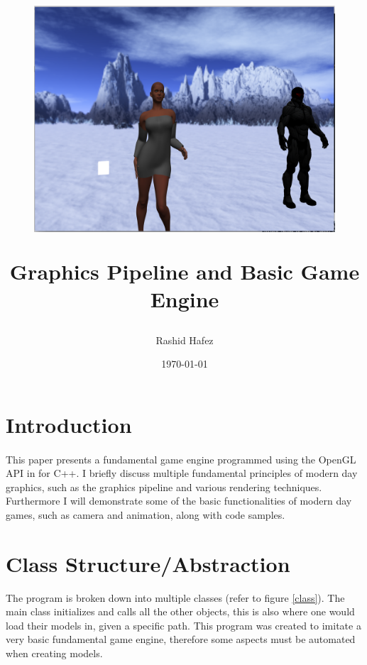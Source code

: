 \documentclass[a4paper,11pt]{article}
\begin{document}
	\title{	\begin{figure}[h]
		\centering
		\includegraphics[scale=0.4]{BK}
		\label{HW-logo}
		\vspace{2 cm}
	\end{figure} 
	Graphics Pipeline and Basic Game Engine}
	\author{Rashid Hafez}
	\date{\today}
	\maketitle
	
	\newpage
	\section{Introduction}
	\paragraph{}
		This paper presents a fundamental game engine programmed using the OpenGL API in for C++. I briefly discuss multiple fundamental principles of modern day graphics, such as the graphics pipeline and various rendering techniques. Furthermore I will demonstrate some of the basic functionalities of modern day games, such as camera and animation, along with code samples.
		
	\clearpage
	\newpage
	\section{Class Structure/Abstraction}
		
		The program is broken down into multiple classes (refer to figure \ref{class}). The main class initializes and calls all the other objects, this is also where one would load their models in, given a specific path. This program was created to imitate a very basic fundamental game engine, therefore some aspects must be automated when creating models.
		
\end{document}
